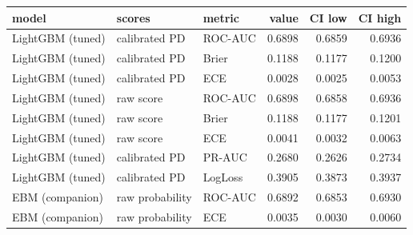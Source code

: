 \begin{tabular}{lllrrr}
\toprule
model & scores & metric & value & CI low & CI high \\
\midrule
LightGBM (tuned) & calibrated PD & ROC-AUC & 0.6898 & 0.6859 & 0.6936 \\
LightGBM (tuned) & calibrated PD & Brier & 0.1188 & 0.1177 & 0.1200 \\
LightGBM (tuned) & calibrated PD & ECE & 0.0028 & 0.0025 & 0.0053 \\
LightGBM (tuned) & raw score & ROC-AUC & 0.6898 & 0.6858 & 0.6936 \\
LightGBM (tuned) & raw score & Brier & 0.1188 & 0.1177 & 0.1201 \\
LightGBM (tuned) & raw score & ECE & 0.0041 & 0.0032 & 0.0063 \\
LightGBM (tuned) & calibrated PD & PR-AUC & 0.2680 & 0.2626 & 0.2734 \\
LightGBM (tuned) & calibrated PD & LogLoss & 0.3905 & 0.3873 & 0.3937 \\
EBM (companion) & raw probability & ROC-AUC & 0.6892 & 0.6853 & 0.6930 \\
EBM (companion) & raw probability & ECE & 0.0035 & 0.0030 & 0.0060 \\
\bottomrule
\end{tabular}
